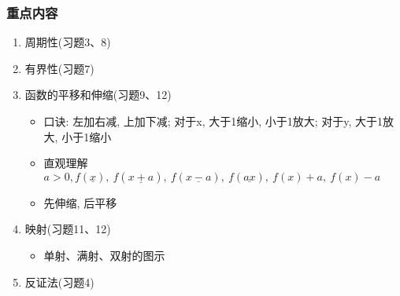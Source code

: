 \documentclass[12pt,UTF8]{ctexart}
\begin{document}
\subsubsection{重点内容}
\begin{enumerate}
   \item 周期性(习题3、8)
   \item 有界性(习题7)
   \item 函数的平移和伸缩(习题9、12)
   		\begin{itemize}
			\item 口诀: 左加右减, 上加下减; 对于x, 大于1缩小, 小于1放大;  对于y, 大于1放大, 小于1缩小
			\item 直观理解$a>0, f(\underline x),\ f(\underline{x+a}),\ f(\underline{x-a}),\ f(\underline{ax}),\ f(x)+a,\ f(x)-a$
			\item 先伸缩, 后平移
		\end{itemize}
   \item 映射(习题11、12)
   		\begin{itemize}
			\item 单射、满射、双射的图示
		\end{itemize}
   \item 反证法(习题4)
\end{enumerate}
\end{document}
